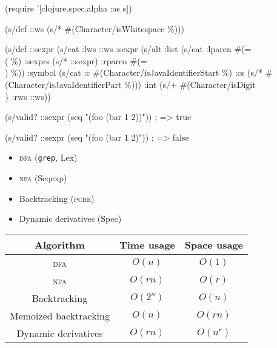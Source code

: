\documentclass{beamer}
\begin{document}
\begin{frame}[fragile]

{\scriptsize
\begin{semiverbatim}
(require '[clojure.spec.alpha :as s])

(s/def ::ws (s/* \#(Character/isWhitespace \%)))

(s/def ::sexpr
  (s/cat
    :lws ::ws
    :sexpr (s/alt
             :list (s/cat :lparen \#(= \\( \%)
                          :sexprs (s/* ::sexpr)
                          :rparen #(= \\) \%))
             :symbol (s/cat :c #(Character/isJavaIdentifierStart \%)
                            :cs (s/* #(Character/isJavaIdentifierPart \%)))
             :int (s/+ \#(Character/isDigit \\\}%
    :rws ::ws))

(s/valid? ::sexpr (seq "(foo (bar 1 2))"))
; => true

(s/valid? ::sexpr (seq "(foo (bar 1 2)"))
; => false
\end{semiverbatim}
}

\end{frame}


\begin{frame}

\begin{itemize}
\item \textsc{dfa} (\texttt{grep}, Lex)
\item \textsc{nfa} (Seqexp)
\item Backtracking (\textsc{pcre})
\item Dynamic derivatives (Spec)
\end{itemize}

\end{frame}


\begin{frame}

\begin{center}
\begin{tabular}{c | c c}
Algorithm & Time usage & Space usage \\
\hline
\textsc{dfa} & \(O(n)\) & \(O(1)\) \\
\textsc{nfa} & \(O(rn)\) & \(O(r)\) \\
Backtracking & \(O(2^n)\) & \(O(n)\) \\
Memoized backtracking & \(O(n)\) & \(O(rn)\) \\
Dynamic derivatives & \(O(rn)\) & \(O(n^r)\)
\end{tabular}
\end{center}

\end{frame}
\end{document}
